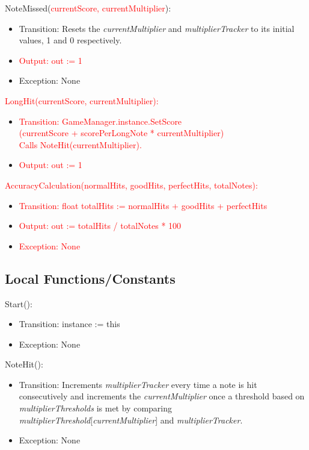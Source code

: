 \documentclass[12pt]{article}
\begin{document}
\noindent NoteMissed(\textcolor{red}{currentScore, currentMultiplier}):
\begin{itemize}
    \item Transition: Resets the \textit{currentMultiplier} and \textit{multiplierTracker} to its initial values, 1 and 0 respectively.
    \item \textcolor{red}{Output: out := 1}
    \item Exception: None
\end{itemize}

\noindent \textcolor{red}{LongHit(currentScore, currentMultiplier):}
\begin{itemize}
    \item \textcolor{red}{Transition: GameManager.instance.SetScore\\(currentScore + scorePerLongNote * currentMultiplier)\\Calls NoteHit(currentMultiplier).}
    \item \textcolor{red}{Output: out := 1}
\end{itemize}

\noindent \textcolor{red}{AccuracyCalculation(normalHits, goodHits, perfectHits, totalNotes):}
\begin{itemize}
    \item \textcolor{red}{Transition: float totalHits := normalHits + goodHits + perfectHits}
    \item \textcolor{red}{Output: out := totalHits / totalNotes * 100}
    \item \textcolor{red}{Exception: None}
\end{itemize}

\subsection{Local Functions/Constants}

\noindent Start():
\begin{itemize}
    \item Transition: instance := this
    \item Exception: None
\end{itemize}

\noindent NoteHit():
\begin{itemize}
    \item Transition: Increments \textit{multiplierTracker} every time a note is hit consecutively and increments the \textit{currentMultiplier} once a threshold based on \textit{multiplierThresholds} is met by comparing \textit{multiplierThreshold}[\textit{currentMultiplier}] and \textit{multiplierTracker}.
    \item Exception: None
\end{itemize}
\end{document}
